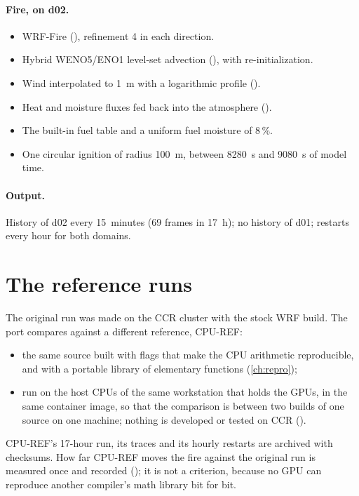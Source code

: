 \paragraph{Fire, on d02.}
\begin{itemize}
  \item WRF-Fire (), refinement 4 in each direction.
  \item Hybrid WENO5/ENO1 level-set advection (), with re-initialization.
  \item Wind interpolated to 1~m with a logarithmic profile ().
  \item Heat and moisture fluxes fed back into the atmosphere ().
  \item The built-in fuel table and a uniform fuel moisture of 8\,\%.
  \item One circular ignition of radius 100~m, between 8280~s and 9080~s of model time.
\end{itemize}

\paragraph{Output.} History of d02 every 15~minutes (69 frames in 17~h); no history of d01; restarts every hour for
both domains.

\section{The reference runs}

The original run was made on the CCR cluster with the stock WRF build. The port compares against a different
reference, CPU-REF:
\begin{itemize}
  \item the same source built with flags that make the CPU arithmetic reproducible, and with a portable library of
    elementary functions (\cref{ch:repro});
  \item run on the host CPUs of the same workstation that holds the GPUs, in the same container image, so that the
    comparison is between two builds of one source on one machine; nothing is developed or tested on CCR
    ().
\end{itemize}
CPU-REF's 17-hour run, its traces and its hourly restarts are archived with checksums. How far CPU-REF moves the
fire against the original run is measured once and recorded (\tbr); it is not a criterion, because no GPU can
reproduce another compiler's math library bit for bit.

